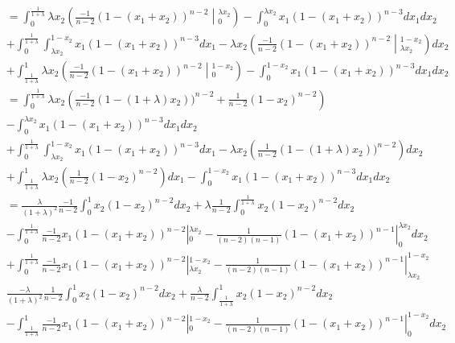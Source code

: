 \documentclass[11pt]{article}
\newcommand{\<}{\langle}
\renewcommand{\>}{\rangle}
\numberwithin{equation}{section}
\begin{document}
 \begin{align*}
 &= \int_{0}^{\frac{1}{1+\lambda}}  \lambda x_2\left( \frac{-1}{n-2}(1-(x_1+x_2))^{n-2} \middle\vert_{0}^{\lambda x_2} \right) - \int_{0}^{\lambda x_2} x_1(1-(x_1+x_2))^{n-3} dx_1  dx_2 \\
 &+ \int_{0}^{\frac{1}{1+\lambda}}  \int_{\lambda x_2}^{1-x_2} x_1(1-(x_1+x_2))^{n-3} dx_1 - \lambda x_2 \left( \frac{-1}{n-2}(1-(x_1+x_2))^{n-2} \middle \vert_{\lambda x_2}^{1-x_2} \right) dx_2\\
 &+ \int_{\frac{1}{1+\lambda}}^{1} \lambda x_2\left( \frac{-1}{n-2}(1-(x_1+x_2))^{n-2} \middle\vert_{0}^{1-x_2} \right) - \int_{0}^{1-x_2}x_1(1-(x_1+x_2))^{n-3}dx_1 dx_2\\
 &= \int_{0}^{\frac{1}{1+\lambda}}  \lambda x_2\left( \frac{-1}{n-2}(1-(1+\lambda)x_2))^{n-2} +\frac{1}{n-2}(1-x_2)^{n-2} \right) \\
 &- \int_{0}^{\lambda x_2} x_1(1-(x_1+x_2))^{n-3} dx_1  dx_2 \\
 &+ \int_{0}^{\frac{1}{1+\lambda}}  \int_{\lambda x_2}^{1-x_2} x_1(1-(x_1+x_2))^{n-3} dx_1 - \lambda x_2 \left( \frac{1}{n-2}(1-(1+\lambda)x_2))^{n-2} \right) dx_2\\
&+ \int_{\frac{1}{1+\lambda}}^1 \lambda x_2\left( \frac{1}{n-2} (1-x_2)^{n-2}  \right)dx_1 - \int_{0}^{1-x_2} x_1 (1-(x_1+x_2))^{n-3}dx_1 dx_2\\
&= \frac{\lambda}{(1+\lambda)^2} \frac{-1}{n-2}\int_{0}^{1} x_2(1-x_2)^{n-2} dx_2 + \lambda \frac{1}{n-2} \int_{0}^{\frac{1}{1+\lambda}} x_2(1-x_2)^{n-2}dx_2\\
&- \int_{0}^{\frac{1}{1+\lambda}} \frac{-1}{n-2}x_1(1-(x_1+x_2))^{n-2}\left\vert_{0}^{\lambda x_2}  -\frac{1}{(n-2)(n-1)}(1-(x_1+x_2))^{n-1} \right\vert_{0}^{\lambda x_2}  dx_2\\
&+\int_{0}^{\frac{1}{1+\lambda}} \frac{-1}{n-2}x_1(1-(x_1+x_2))^{n-2} \left\vert_{\lambda x_2}^{1-x_2} - \frac{1}{(n-2)(n-1)}(1-(x_1+x_2))^{n-1} \right\vert_{\lambda x_2}^{1-x_2}\\
& \frac{-\lambda}{(1+\lambda)^2}\frac{1}{n-2}\int_{0}^{1}x_2(1-x_2)^{n-2}dx_2 + \frac{\lambda}{n-2} \int_{\frac{1}{1+\lambda}}^{1} x_2(1-x_2)^{n-2} dx_2\\
&- \int_{\frac{1}{1+\lambda}}^{1} \frac{-1}{n-2}x_1(1-(x_1+x_2))^{n-2} \left\vert_{0}^{1-x_2} - \frac{1}{(n-2)(n-1)}(1-(x_1+x_2))^{n-1}\right\vert_{0}^{1-x_2} dx_2\\
\end{align*}
\end{document}

